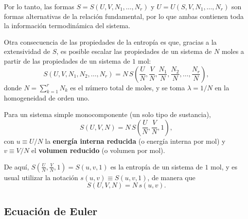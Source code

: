 Por lo tanto, las formas $S=S(U,V,N_1,\dots,N_r)$ y $U=U(S,V,N_1,\dots,N_r)$ son formas
alternativas de la relación fundamental, por lo que ambas contienen toda la información
termodinámica del sistema.

Otra consecuencia de las propiedades de la entropía es que, gracias a la extensividad de $S$, es
posible escalar las propiedades de un sistema de $N$ moles a partir de las propiedades de un sistema
de $1$ mol:
\begin{equation*}
  S(U,V,N_1,N_2,\dots,N_r)=N\,S\!\left(\frac{U}{N},\frac{V}{N},\frac{N_1}{N},\frac{N_2}{N},\dots,\frac{N_r}{N}\right),
\end{equation*}
donde $N=\sum_{k=1}^{r}N_k$ es el número total de moles, y se toma $\lambda=1/N$ en la
homogeneidad de orden uno.

Para un sistema simple monocomponente (un solo tipo de sustancia),
\begin{equation*}
  S(U,V,N)=N\,S\!\left(\frac{U}{N},\frac{V}{N},1\right),
\end{equation*}
con $u\equiv U/N$ la \textbf{energía interna reducida} (o energía interna por mol) y
$v\equiv V/N$ el \textbf{volumen reducido} (o volumen por mol).

De aquí, $S\!\left(\frac{U}{N},\frac{V}{N},1\right)=S(u,v,1)$ es la entropía de un sistema de $1$ mol,
y es usual utilizar la notación $s(u,v)\equiv S(u,v,1)$, de manera que
\begin{equation*}
  S(U,V,N)=N\,s(u,v).
\end{equation*}

\subsection*{Ecuación de Euler}

